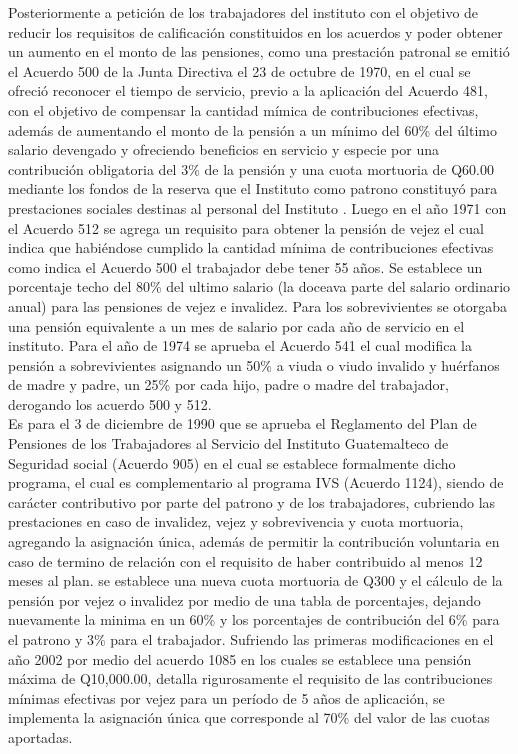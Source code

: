 \documentclass[12pt,letterpaper,titlepage]{article}
\begin{document}
{Posteriormente a petición de los trabajadores del instituto con el objetivo de reducir los requisitos de calificación constituidos en los acuerdos  y poder obtener un aumento en el monto de las pensiones, como una prestación patronal se emitió el Acuerdo 500 de la Junta Directiva el 23 de octubre de 1970, en el cual se ofreció reconocer el tiempo de servicio, previo a la aplicación del Acuerdo 481, con el objetivo de compensar la cantidad mímica de contribuciones efectivas, además de aumentando el monto de la pensión a un mínimo del 60\% del último salario devengado y ofreciendo beneficios en servicio y especie por una contribución obligatoria del 3\% de la pensión y una cuota mortuoria de Q60.00 mediante los fondos de la reserva que el Instituto como patrono  constituyó para prestaciones sociales destinas al personal del Instituto . Luego en el año 1971 con el Acuerdo 512 se agrega un requisito para obtener la pensión de vejez el cual indica que habiéndose cumplido la cantidad mínima de contribuciones efectivas como indica el Acuerdo 500 el trabajador debe tener 55 años. Se establece un porcentaje techo del 80\% del ultimo salario (la doceava parte del salario ordinario anual) para las pensiones de vejez e invalidez. Para los sobrevivientes se otorgaba una pensión equivalente a un mes de salario por cada año de servicio en el instituto. Para el año de 1974 se aprueba el Acuerdo 541 el cual modifica la pensión a sobrevivientes asignando un 50\% a viuda o viudo invalido y huérfanos de madre y padre, un 25\% por cada hijo, padre o madre del trabajador, derogando los acuerdo 500 y 512.\\


Es para el 3 de diciembre de 1990 que se aprueba el Reglamento del Plan de Pensiones de los Trabajadores al Servicio del Instituto Guatemalteco de Seguridad social (Acuerdo 905) en el cual se establece formalmente dicho programa, el cual es complementario al programa IVS (Acuerdo 1124), siendo de carácter contributivo por parte del patrono y de los trabajadores, cubriendo las prestaciones en caso de invalidez, vejez y sobrevivencia y cuota mortuoria, agregando la asignación única, además de permitir la contribución voluntaria en caso de termino de relación con el requisito de haber contribuido al menos 12 meses al plan. se establece una nueva cuota mortuoria de Q300 y el cálculo de la pensión por vejez o invalidez por medio de una tabla de porcentajes, dejando nuevamente la minima en un 60\% y los porcentajes de contribución del 6\% para el patrono y 3\% para el trabajador. Sufriendo las primeras modificaciones en el año 2002 por medio del acuerdo 1085 en los cuales se establece una pensión máxima de Q10,000.00, detalla rigurosamente el requisito de las contribuciones mínimas efectivas por vejez para un período de 5 años de aplicación, se implementa la asignación única que corresponde al 70\% del valor de las cuotas aportadas. \\

}
\end{document}
